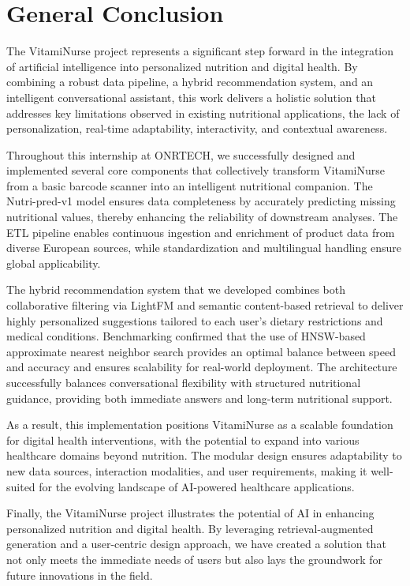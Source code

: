 \chapter*{General Conclusion}
The VitamiNurse project represents a significant step forward in the integration of artificial intelligence into personalized nutrition and digital health. 
By combining a robust data pipeline, 
a hybrid recommendation system, and an intelligent conversational assistant, this work delivers a holistic solution that addresses key limitations observed 
in existing nutritional applications, the lack of personalization, real-time adaptability, interactivity, and contextual awareness. 

Throughout this internship at ONRTECH, we successfully designed and implemented several core components that collectively transform VitamiNurse from a basic 
barcode scanner into an intelligent nutritional companion. The Nutri-pred-v1 model ensures data completeness by accurately predicting missing nutritional values, 
thereby enhancing the reliability of downstream analyses. The ETL pipeline enables continuous ingestion and enrichment of product data from diverse European sources, 
while standardization and multilingual handling ensure global applicability. 

The hybrid recommendation system that we developed combines both collaborative filtering via LightFM and semantic content-based retrieval to deliver highly personalized suggestions tailored to each user’s dietary restrictions and medical conditions. 
Benchmarking confirmed that the use of HNSW-based approximate nearest neighbor search provides an optimal balance between speed and accuracy and  ensures scalability for real-world deployment. 
The architecture successfully balances conversational flexibility with structured nutritional guidance, providing both immediate answers and long-term nutritional support.

As a result, this implementation positions VitamiNurse as a scalable foundation for digital health interventions, with the potential to expand into various healthcare domains beyond nutrition. 
The modular design ensures adaptability to new data sources, interaction modalities, and user requirements, making it well-suited for the evolving landscape of AI-powered healthcare applications.

Finally, the VitamiNurse project illustrates the potential of AI in enhancing personalized nutrition and digital health. By leveraging retrieval-augmented generation and a user-centric design approach, we have created a solution that not only meets the immediate needs of users but also lays the groundwork for future innovations in the field.